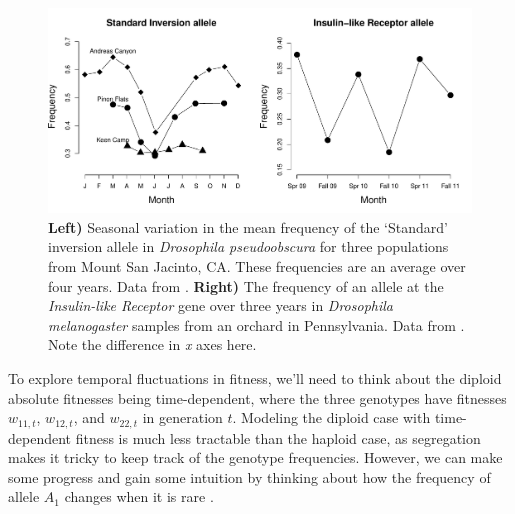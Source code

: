 \begin{figure}
\begin{center}
\includegraphics[width=\textwidth]{Journal_figs/single_locus_selection/temporal_Droso_freq/temporal_Droso_freq.pdf}
\end{center}
\caption{{\bf Left)} Seasonal variation in the mean frequency of the `Standard' inversion allele in
  {\it Drosophila pseudoobscura} for three populations from Mount San
  Jacinto, CA. These frequencies are an average
  over four years. Data from \citet{wright:46}. {\bf Right)} The
  frequency of an allele at the {\it Insulin-like Receptor} gene over three
  years in {\it Drosophila melanogaster} samples from an orchard in
  Pennsylvania. Data from \citet{paaby:14}. Note the difference in
  {\it x}
  axes here. } \label{fig:Droso_fluct} 
\end{figure}

To explore temporal fluctuations in fitness, we'll need to
think about the diploid absolute fitnesses being time-dependent, where the three genotypes  have fitnesses
$w_{11,t}$, $w_{12,t}$, and $w_{22,t}$ in generation $t$. Modeling
the diploid case with time-dependent fitness is much less tractable than the haploid case, as segregation
makes it tricky to keep track of the genotype frequencies.  
However, we can make some progress and gain some intuition by thinking about
how the frequency of allele $A_1$ changes when it is rare
\citep[following the work of ][]{haldane1963}.\\



